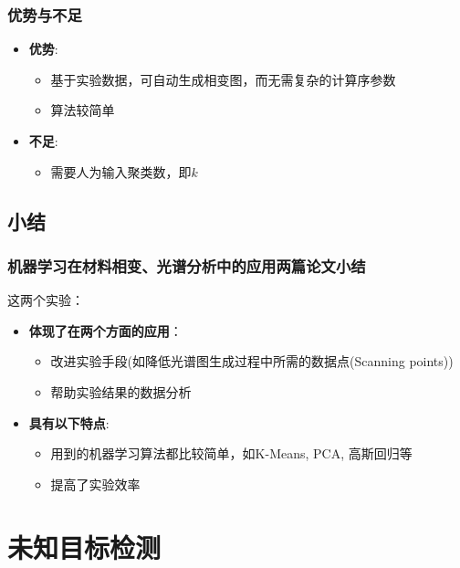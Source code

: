 \documentclass{beamer}
\begin{document}
\begin{frame}
\frametitle{优势与不足}
\begin{itemize}
\item \textbf{优势}:
\begin{itemize}
\item 基于实验数据，可自动生成相变图，而无需复杂的计算序参数
\item 算法较简单
\end{itemize}
\item \textbf{不足}:
\begin{itemize}
\item 需要人为输入聚类数，即$k$
\end{itemize}
 
\end{itemize}

\end{frame}

\subsection{小结}

\begin{frame}
\tableofcontents[
sectionstyle=show/show,
subsectionstyle=show/share/hide,
currentsubsection,
]
\end{frame}

\begin{frame}
\frametitle{机器学习在材料相变、光谱分析中的应用两篇论文小结}
这两个实验：
\begin{itemize}
\item \textbf{体现了在两个方面的应用}：
\begin{itemize}
\item 改进实验手段(如降低光谱图生成过程中所需的数据点(Scanning points))
\item 帮助实验结果的数据分析
\end{itemize}
\item \textbf{具有以下特点}:
\begin{itemize}
\item 用到的机器学习算法都比较简单，如K-Means, PCA, 高斯回归等
\item 提高了实验效率
\end{itemize}
\end{itemize}
\end{frame}

\section{未知目标检测}
\end{document}
